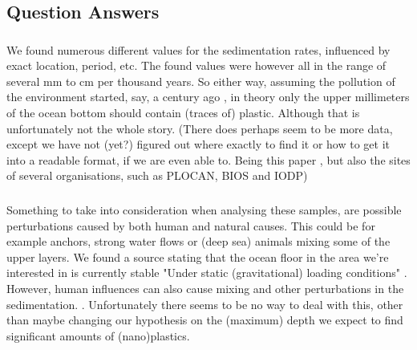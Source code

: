\documentclass[twocolumn,a4paper,aps,amsmath,amssymb,floatfix,superscriptaddress]{revtex4-2}
\begin{document}
	\subsection{Question Answers}
	\subsubsection{}
	We found numerous different values for the sedimentation rates, influenced by exact location, period, etc. The found values were however all in the range of several mm \cite{Sediment distribution in the Atlantic} to cm \cite{Geomorphical investigaions NW Africa} per thousand years. So either way, assuming the pollution of the environment started, say, a century ago \cite{History of Plastic}, in theory only the upper millimeters of the ocean bottom should contain (traces of) plastic. Although that is unfortunately not the whole story.
	(There does perhaps seem to be more data, except we have not (yet?) figured out where exactly to find it or how to get it into a readable format, if we are even able to. Being this paper \cite{Atlantic sediment cores last 40k years}, but also the sites of several organisations, such as PLOCAN, BIOS and IODP)
	\subsubsection{}
	Something to take into consideration when analysing these samples, are possible perturbations caused by both human and natural causes. This could be for example anchors, strong water flows or (deep sea) animals mixing some of the upper layers. We found a source stating that the ocean floor in the area we're interested in is currently stable "Under static (gravitational) loading conditions" \cite{Sediment stability western Canary Islands}. However, human influences can also cause mixing and other perturbations in the sedimentation. \cite{Anthrophogenic influence sedimentation} \cite{Human impacts marine fossil record}. Unfortunately there seems to be no way to deal with this, other than maybe changing our hypothesis on the (maximum) depth we expect to find significant amounts of (nano)plastics.
	\subsubsection{}
	
	\subsubsection{}
	
\end{document}
